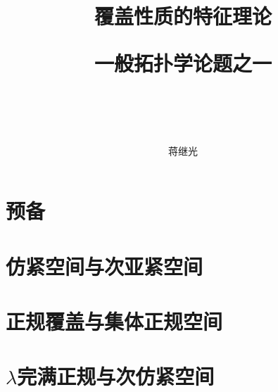 \documentclass[zihao=-4,heading=true,a4paper,twoside,openany]{ctexbook}
\title{
覆盖性质的特征理论\\
	\begin{kaishu}一般拓扑学论题之一\end{kaishu}\\
}
\author{\kaishu 蒋继光}
\date{}
\begin{document}
\begin{titlepage}
	\maketitle
\end{titlepage}

\setcounter{page}{5}%
{}
\tableofcontents

\mainmatter
{}


\chapter{预备}\label{chap:1}



\chapter{仿紧空间与次亚紧空间}\label{chap2}



\chapter{正规覆盖与集体正规空间}\label{chap3}


\chapter{$\lambda$完满正规与次仿紧空间}\label{chap4}




\backmatter

\printbibliography

\begin{small}
	\thispagestyle{empty}
	\onecolumn
	\printindex
\end{small}
\vfill
\eject
\end{document}
